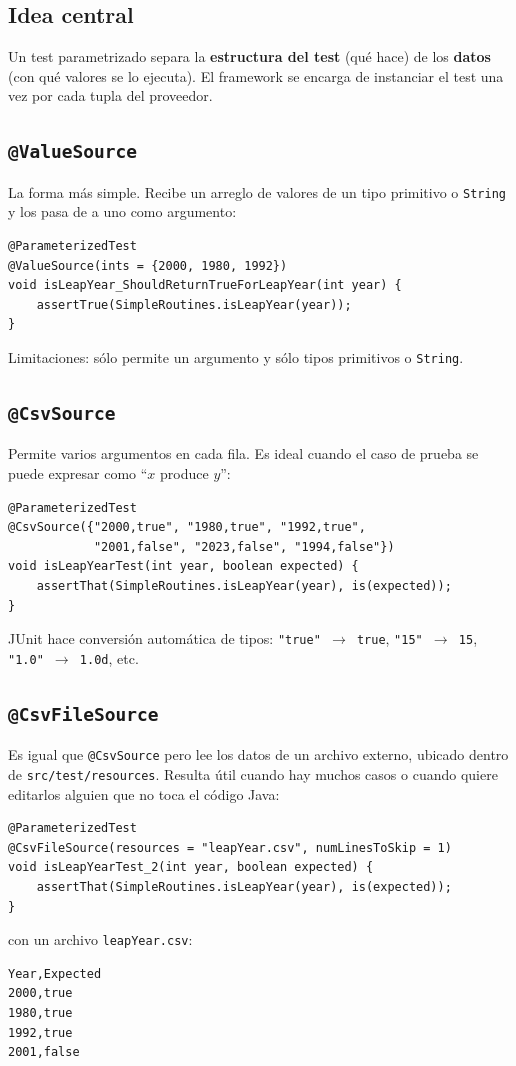 \documentclass[12pt,a4paper]{article}
\begin{document}
\subsection{Idea central}
Un test parametrizado separa la \textbf{estructura del test} (qué hace) de los \textbf{datos} (con qué valores se lo ejecuta). El framework se encarga de instanciar el test una vez por cada tupla del proveedor.

\subsection{\texttt{@ValueSource}}
La forma más simple. Recibe un arreglo de valores de un tipo primitivo o \texttt{String} y los pasa de a uno como argumento:
\begin{lstlisting}[style=javastyle]
@ParameterizedTest
@ValueSource(ints = {2000, 1980, 1992})
void isLeapYear_ShouldReturnTrueForLeapYear(int year) {
    assertTrue(SimpleRoutines.isLeapYear(year));
}
\end{lstlisting}
Limitaciones: sólo permite un argumento y sólo tipos primitivos o \texttt{String}.

\subsection{\texttt{@CsvSource}}
Permite varios argumentos en cada fila. Es ideal cuando el caso de prueba se puede expresar como ``$x$ produce $y$'':
\begin{lstlisting}[style=javastyle]
@ParameterizedTest
@CsvSource({"2000,true", "1980,true", "1992,true",
            "2001,false", "2023,false", "1994,false"})
void isLeapYearTest(int year, boolean expected) {
    assertThat(SimpleRoutines.isLeapYear(year), is(expected));
}
\end{lstlisting}
JUnit hace conversión automática de tipos: \texttt{"true" $\rightarrow$ true}, \texttt{"15" $\rightarrow$ 15}, \texttt{"1.0" $\rightarrow$ 1.0d}, etc.

\subsection{\texttt{@CsvFileSource}}
Es igual que \texttt{@CsvSource} pero lee los datos de un archivo externo, ubicado dentro de \texttt{src/test/resources}. Resulta útil cuando hay muchos casos o cuando quiere editarlos alguien que no toca el código Java:
\begin{lstlisting}[style=javastyle]
@ParameterizedTest
@CsvFileSource(resources = "leapYear.csv", numLinesToSkip = 1)
void isLeapYearTest_2(int year, boolean expected) {
    assertThat(SimpleRoutines.isLeapYear(year), is(expected));
}
\end{lstlisting}
con un archivo \texttt{leapYear.csv}:
\begin{verbatim}
Year,Expected
2000,true
1980,true
1992,true
2001,false
\end{verbatim}
\end{document}
